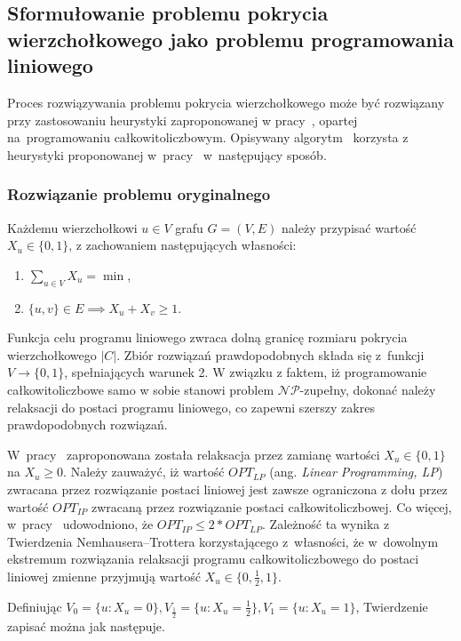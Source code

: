 \subsection{Sformułowanie problemu pokrycia wierzchołkowego jako problemu programowania liniowego}\label{section_kernelization_lp_formulation}

Proces rozwiązywania problemu pokrycia wierzchołkowego może być rozwiązany
przy zastosowaniu heurystyki zaproponowanej w pracy~\cite{hochbaum82}, opartej 
na~programowaniu całkowitoliczbowym.
Opisywany algorytm~\cite[rozdz.~4.2.2]{abukhzam03} korzysta z~ heurystyki proponowanej w~pracy~\cite{hochbaum82} 
w~następujący sposób.

\subsubsection{\textbf{Rozwiązanie problemu oryginalnego}}\label{ss_lp_original}
Każdemu wierzchołkowi $u \in V$ grafu $G=(V,E)$ należy przypisać wartość $X_u
\in \{0, 1\}$, z zachowaniem następujących własności:
\begin{enumerate}
  \item $\sum_{u \in V}X_u = \min$,
  \item $\{u,v\} \in E \implies X_u + X_v \geq 1$.
\end{enumerate}

Funkcja celu programu liniowego zwraca dolną granicę rozmiaru pokrycia wierzchołkowego $|C|$.
Zbiór rozwiązań prawdopodobnych składa się z~funkcji $V \to \{0, 1\}$,
spełniających warunek 2.
W związku z faktem, iż programowanie całkowitoliczbowe samo w sobie stanowi
problem $\mathcal{NP}$-zupełny, dokonać należy relaksacji do postaci programu liniowego, co
zapewni szerszy zakres prawdopodobnych rozwiązań.

W~pracy~\cite{khuller02} zaproponowana została relaksacja przez zamianę wartości 
$X_u \in \{0,1\}$ na $X_u \geq 0$.
Należy zauważyć, iż wartość $OPT_{LP}$ (ang. \emph{Linear Programming, LP}) zwracana przez rozwiązanie postaci 
liniowej jest zawsze ograniczona z dołu przez wartość $OPT_{IP}$ zwracaną przez 
rozwiązanie postaci całkowitoliczbowej.
Co więcej, w~pracy~\cite{khuller02} udowodniono, że $OPT_{IP} \leq 2*OPT_{LP}$.
Zależność ta wynika z Twierdzenia Nemhausera--Trottera korzystającego
z~własności, że w~dowolnym ekstremum rozwiązania relaksacji programu
całkowitoliczbowego do postaci liniowej zmienne przyjmują wartość 
$X_u \in \{0, \frac{1}{2}, 1\}$.

Definiując $V_0 = \{u : X_u=0\}, V_{\frac{1}{2}}=\{u: X_u=\frac{1}{2}\},
V_1=\{u: X_u=1\}$, Twierdzenie zapisać można jak następuje.


